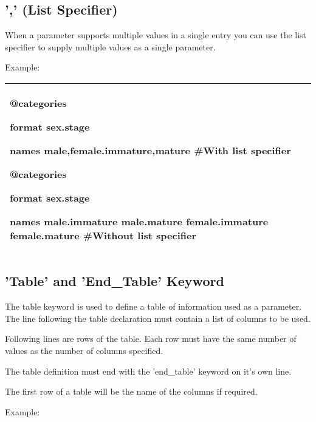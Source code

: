 \documentclass[a4paper,11pt,twoside,pdftex,draft]{article}
\begin{document}
\hypertarget{list-specifier}{%
\subsection{',' (List Specifier)}\label{list-specifier}}

When a parameter supports multiple values in a single entry you can use
the list specifier to supply multiple values as a single parameter.

Example:

\begin{longtable}[]{@{}l@{}}
\toprule
\endhead
\begin{minipage}[t]{0.97\columnwidth}\raggedright
@categories

format sex.stage

names male,female.immature,mature \#With list specifier

@categories

format sex.stage

names male.immature male.mature female.immature female.mature \#Without
list specifier\strut
\end{minipage}\tabularnewline
\bottomrule
\end{longtable}

\hypertarget{table-and-end_table-keyword}{%
\subsection{'Table' and 'End\_Table'
Keyword}\label{table-and-end_table-keyword}}

The table keyword is used to define a table of information used as a
parameter. The line following the table declaration must contain a list
of columns to be used.

Following lines are rows of the table. Each row must have the same
number of values as the number of columns specified.

The table definition must end with the 'end\_table' keyword on it's own
line.

The first row of a table will be the name of the columns if required.

Example:
\end{document}
